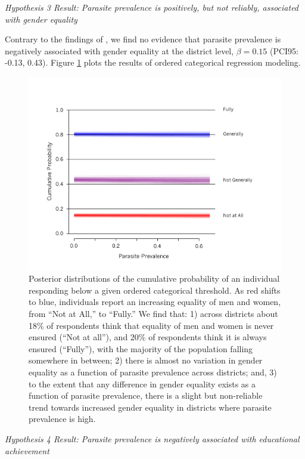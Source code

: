 \documentclass[12pt]{article}
\begin{document}
	
\noindent\textit{Hypothesis 3 Result: Parasite prevalence is positively, but not reliably, associated with gender equality}

	Contrary to the findings of \citet{Thornhill2009}, we find no evidence that parasite prevalence is negatively associated with gender equality at the district level, $\beta=0.15$ (PCI95: -0.13, 0.43).  Figure \ref{resGen} plots the results of ordered categorical regression modeling.\\
 \begin{figure}
\caption{\label{resGen}  Posterior distributions of the cumulative probability of an individual responding below a given ordered categorical threshold. As red shifts to blue, individuals report an increasing equality of men and women, from ``Not at All,'' to ``Fully.'' We find that: 1) across districts about 18\% of respondents think that equality of men and women is never ensured (``Not at all''), and 20\% of respondents think it is always ensured (``Fully''), with the majority of the population falling somewhere in between; 2) there is almost no variation in gender equality as a function of parasite prevalence across districts; and, 3) to the extent that any difference in gender equality exists as a function of parasite prevalence, there is a slight but non-reliable trend towards increased gender equality in districts where parasite prevalence is high. }
\includegraphics[width=5in]{Figures/GenderEqualityModel} 
\end{figure}

\noindent\textit{Hypothesis 4 Result: Parasite prevalence is negatively associated with educational achievement}
\end{document}
